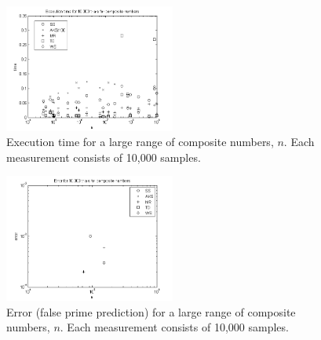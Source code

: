 \begin{figure}
	\centering
	\includegraphics[width=0.5\textwidth]{../Graphs/ExecutionTime2.png}
	\caption{Execution time for a large range of composite numbers, $n$. Each measurement consists of 10,000 samples.}
	\label{fig:executionTime2}
\end{figure}



\begin{figure}
	\centering
	\includegraphics[width=0.5\textwidth]{../Graphs/Error2.png}
	\caption{Error (false prime prediction) for a large range of composite numbers, $n$. Each measurement consists of 10,000 samples.}
	\label{fig:error2}
\end{figure}

